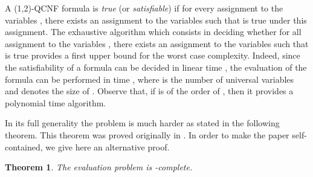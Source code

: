 \documentclass[aop,noinfoline]{imsart}
\newtheorem{theorem}{Theorem}[section]
\newcommand{\onetwo}{(1,2)}
\newcommand{\onetwoqcnf}{\mbox{\sf \onetwo-QCNF}}
\begin{document}
A \onetwoqcnf{} formula is {\it true} (or {\it satisfiable}) if for
every assignment  to the variables , there exists an assignment to
the variables  such that  is true under this assignment.
The exhaustive algorithm which consists in deciding whether for
all assignment to the variables , there exists an assignment to
the variables  such that  is true provides a first
upper bound for the worst case complexity. Indeed, since the
satisfiability of a  formula can be decided in linear time
\cite{AspvallPT-79}, the evaluation of the formula  can be performed in time , where  is the number of universal variables and
 denotes the size of . Observe that,
if  is of the order of , then it
provides a polynomial time algorithm. 

In its full generality the problem  is much harder as stated in the
following theorem. This theorem
was proved originally   in \cite{FloegelKKB-90}. In
order to make the paper self-contained,  we give here an
alternative proof.




 \begin{theorem} {\rm \cite{FloegelKKB-90}}\label{thm:complexity}
    The  evaluation problem  is -complete.
 \end{theorem}
 
\end{document}

